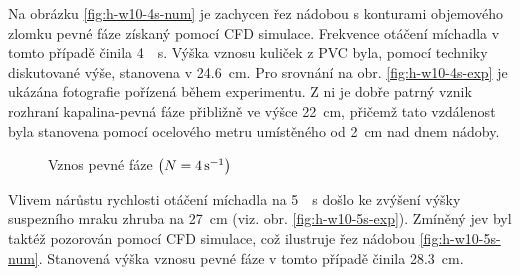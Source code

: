 Na obrázku \ref{fig:h-w10-4s-num} je zachycen řez nádobou s konturami objemového zlomku pevné fáze získaný pomocí CFD simulace. Frekvence otáčení míchadla v tomto případě činila \SI{4}{\per\second}. Výška vznosu kuliček z PVC byla, pomocí techniky diskutované výše, stanovena v \SI{24.6}{\centi\meter}. Pro srovnání na obr. \ref{fig:h-w10-4s-exp} je ukázána fotografie pořízená během experimentu. Z ni je dobře patrný vznik rozhraní kapalina-pevná fáze přibližně ve výšce \SI{22}{\centi\meter}, přičemž tato vzdálenost byla stanovena pomocí ocelového metru umístěného od \SI{2}{\centi\meter} nad dnem nádoby.

\begin{figure}[h!]
 \centering
  \qquad 
  \caption{Vznos pevné fáze $\left( N=\SI{4}{\per\second} \right)$}
  \label{fig:h-w10-4s}
\end{figure}

Vlivem nárůstu rychlosti otáčení míchadla na \SI{5}{\per\second} došlo ke zvýšení výšky suspezního mraku zhruba na \SI{27}{\centi\meter} (viz. obr. \ref{fig:h-w10-5s-exp}). Zmíněný jev byl taktéž pozorován pomocí CFD simulace, což ilustruje řez nádobou \ref{fig:h-w10-5s-num}. Stanovená výška vznosu pevné fáze v tomto případě činila \SI{28.3}{\centi\meter}. 
\newpage

